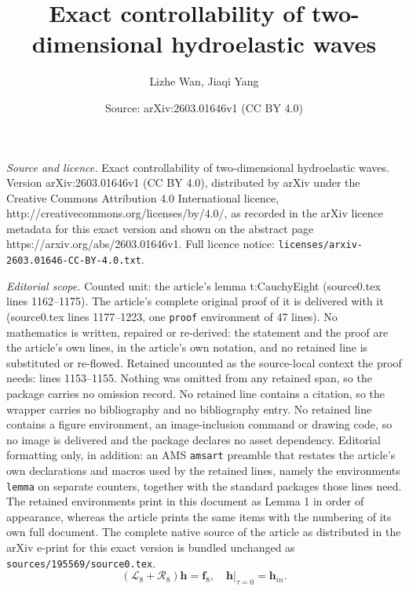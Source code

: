 \documentclass[10pt,a4paper]{amsart}
\title{Exact controllability of two-dimensional hydroelastic waves}
\author{Lizhe Wan, Jiaqi Yang}
\date{Source: arXiv:2603.01646v1 (CC BY 4.0)}
\newcommand{\mL}{\mathcal{L}}
\newcommand{\mR}{\mathcal{R}}
\begin{document}
\maketitle

\noindent\emph{Source and licence.} Exact controllability of two-dimensional hydroelastic waves. Version arXiv:2603.01646v1 (CC BY 4.0), distributed by arXiv under the Creative Commons Attribution 4.0 International licence, http://creativecommons.org/licenses/by/4.0/, as recorded in the arXiv licence metadata for this exact version and shown on the abstract page https://arxiv.org/abs/2603.01646v1. Full licence notice: \texttt{licenses/arxiv-2603.01646-CC-BY-4.0.txt}.\par\smallskip

\noindent\textit{Editorial scope.} Counted unit: the article's lemma t:CauchyEight (source0.tex lines 1162--1175). The article's complete original proof of it is delivered with it (source0.tex lines 1177--1223, one \texttt{proof} environment of 47 lines). No mathematics is written, repaired or re-derived: the statement and the proof are the article's own lines, in the article's own notation, and no retained line is substituted or re-flowed.  Retained uncounted as the source-local context the proof needs: lines 1153--1155.  Nothing was omitted from any retained span, so the package carries no omission record.  No retained line contains a citation, so the wrapper carries no bibliography and no bibliography entry.  No retained line contains a figure environment, an image-inclusion command or drawing code, so no image is delivered and the package declares no asset dependency.  Editorial formatting only, in addition: an AMS \texttt{amsart} preamble that restates the article's own declarations and macros used by the retained lines, namely the environments \texttt{lemma} on separate counters, together with the standard packages those lines need.  The retained environments print in this document as Lemma 1 in order of appearance, whereas the article prints the same items with the numbering of its own full document.  The complete native source of the article as distributed in the arXiv e-print for this exact version is bundled unchanged as \texttt{sources/195569/source0.tex}.
\begin{equation} \label{CauchyEight}
  (\mL_8 + \mR_8)\mathbf{h} = \mathbf{f}_8, \quad \mathbf{h}|_{\tau=0} = \mathbf{h}_{in}. 
\end{equation}
\end{document}
